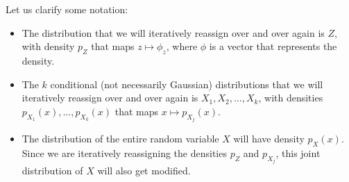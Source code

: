 \documentclass{article}
\begin{document}
      Let us clarify some notation: 
      \begin{itemize}
        \item The distribution that we will iteratively reassign over and over again is $Z$, with density $p_Z$ that maps $z \mapsto \phi_z$, where $\phi$ is a vector that represents the density.
        \item The $k$ conditional (not necessarily Gaussian) distributions that we will iteratively reassign over and over again is $X_1, X_2, \ldots, X_k$, with densities $p_{X_1} (x), \ldots, p_{X_k} (x)$ that maps $x \mapsto p_{X_j} (x)$.
        \item The distribution of the entire random variable $X$ will have density $p_X (x)$. Since we are iteratively reassigning the densities $p_Z$ and $p_{X_j}$, this joint distribution of $X$ will also get modified.
      \end{itemize}
\end{document}
